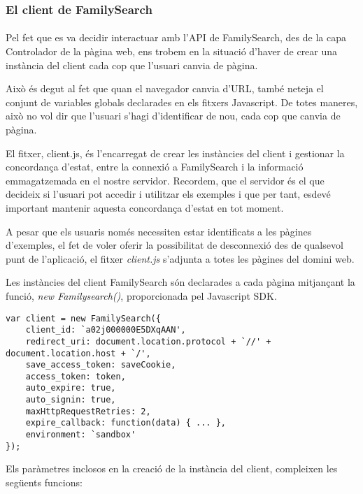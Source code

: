 \subsubsection{El client de FamilySearch}

\paragraph{}
Pel fet que es va decidir interactuar amb l'API de FamilySearch, des de la capa Controlador de la pàgina web, ens trobem en la situació d'haver de crear una instància del client cada cop que l'usuari canvia de pàgina.

Això és degut al fet que quan el navegador canvia d'URL, també neteja el conjunt de variables globals declarades en els fitxers Javascript. De totes maneres, això no vol dir que l'usuari s'hagi d'identificar de nou, cada cop que canvia de pàgina.

El fitxer, client.js, és l'encarregat de crear les instàncies del client i gestionar la concordança d'estat, entre la connexió a FamilySearch i la informació emmagatzemada en el nostre servidor. Recordem, que el servidor és el que decideix si l'usuari pot accedir i utilitzar els exemples i que per tant, esdevé important mantenir aquesta concordança d'estat en tot moment.

A pesar que els usuaris només necessiten estar identificats a les pàgines d'exemples, el fet de voler oferir la possibilitat de desconnexió des de qualsevol punt de l'aplicació, el fitxer \emph{client.js} s'adjunta a totes les pàgines del domini web.

Les instàncies del client FamilySearch són declarades a cada pàgina mitjançant la funció, \emph{new Familysearch()}, proporcionada pel Javascript SDK.

\begin{lstlisting}[style=rawOwn,caption={Creació d'una instància del client FamilySearch}]
var client = new FamilySearch({
    client_id: `a02j000000E5DXqAAN',
    redirect_uri: document.location.protocol + `//' + document.location.host + `/',
    save_access_token: saveCookie,
    access_token: token,
    auto_expire: true,
    auto_signin: true,
    maxHttpRequestRetries: 2,
    expire_callback: function(data) { ... },
    environment: `sandbox'
});
\end{lstlisting}

Els paràmetres inclosos en la creació de la instància del client, compleixen les següents funcions:

